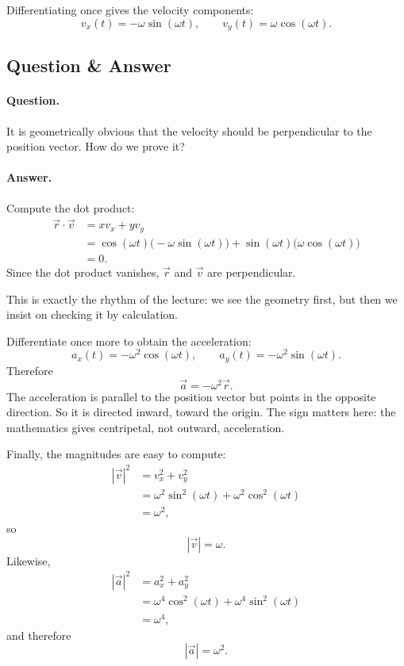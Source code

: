 Differentiating once gives the velocity components:
\begin{equation}
v_x(t)=-\omega\sin(\omega t),\qquad v_y(t)=\omega\cos(\omega t).
\end{equation}

\subsection{Question \& Answer}

\paragraph{Question.} It is geometrically obvious that the velocity should be perpendicular to the position vector. How do we prove it?

\paragraph{Answer.} Compute the dot product:
\begin{align}
\vec r\cdot\vec v
  &= x v_x + y v_y \\
  &= \cos(\omega t)\bigl(-\omega\sin(\omega t)\bigr)
   + \sin(\omega t)\bigl(\omega\cos(\omega t)\bigr) \\
  &= 0.
\end{align}
Since the dot product vanishes, \(\vec r\) and \(\vec v\) are perpendicular.

This is exactly the rhythm of the lecture: we see the geometry first, but then we insist on checking it by calculation.

Differentiate once more to obtain the acceleration:
\begin{equation}
a_x(t)=-\omega^2\cos(\omega t),\qquad a_y(t)=-\omega^2\sin(\omega t).
\end{equation}
Therefore
\begin{equation}
\vec a=-\omega^2\vec r.
\end{equation}
The acceleration is parallel to the position vector but points in the opposite direction. So it is directed inward, toward the origin. The sign matters here: the mathematics gives centripetal, not outward, acceleration.

Finally, the magnitudes are easy to compute:
\begin{align}
|\vec v|^2
  &= v_x^2+v_y^2 \\
  &= \omega^2\sin^2(\omega t)+\omega^2\cos^2(\omega t) \\
  &= \omega^2,
\end{align}
so
\[
|\vec v|=\omega.
\]
Likewise,
\begin{align}
|\vec a|^2
  &= a_x^2+a_y^2 \\
  &= \omega^4\cos^2(\omega t)+\omega^4\sin^2(\omega t) \\
  &= \omega^4,
\end{align}
and therefore
\[
|\vec a|=\omega^2.
\]

